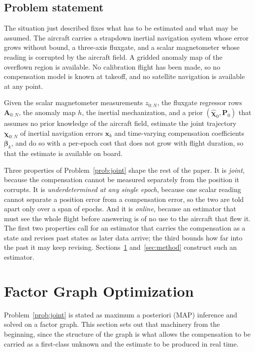 \subsection{Problem statement}\label{sec:statement}
The situation just described fixes what has to be estimated and what may be
assumed. The aircraft carries a strapdown inertial navigation system whose
error grows without bound, a three-axis fluxgate, and a scalar magnetometer
whose reading is corrupted by the aircraft field. A gridded anomaly map of the
overflown region is available. No calibration flight has been made, so no
compensation model is known at takeoff, and no satellite navigation is
available at any point.

\begin{problem}\label{prob:joint}
Given the scalar magnetometer measurements $z_{0:N}$, the fluxgate regressor
rows $\mathbf{A}_{0:N}$, the anomaly map $h$, the inertial mechanization, and a
prior $(\hat{\boldsymbol{\chi}}_0,\mathbf{P}_0)$ that assumes no prior
knowledge of the aircraft field, estimate the joint trajectory
$\boldsymbol{\chi}_{0:N}$ of inertial navigation errors $\mathbf{x}_k$ and
time-varying compensation coefficients $\boldsymbol{\beta}_k$, and do so with a
per-epoch cost that does not grow with flight duration, so that the estimate is
available on board.
\end{problem}

Three properties of Problem~\ref{prob:joint} shape the rest of the paper. It is
\emph{joint}, because the compensation cannot be measured separately from the
position it corrupts. It is \emph{underdetermined at any single epoch}, because
one scalar reading cannot separate a position error from a compensation error,
so the two are told apart only over a span of epochs. And it is
\emph{online}, because an estimator that must see the whole flight before
answering is of no use to the aircraft that flew it. The first two properties
call for an estimator that carries the compensation as a state and revises past
states as later data arrive; the third bounds how far into the past it may keep
revising. Sections~\ref{sec:fgo} and~\ref{sec:method} construct such an
estimator.

\section{Factor Graph Optimization}\label{sec:fgo}
Problem~\ref{prob:joint} is stated as maximum a posteriori (MAP) inference and
solved on a factor graph. This section sets out that machinery from the
beginning, since the structure of the graph is what allows the compensation to
be carried as a first-class unknown and the estimate to be produced in real
time.

